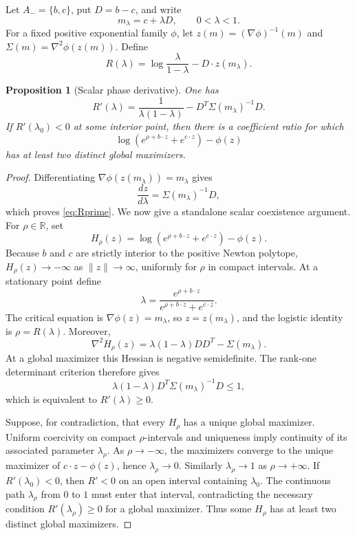 \documentclass[11pt]{article}
\theoremstyle{plain}
\newtheorem{proposition}[theorem]{Proposition}
\theoremstyle{definition}
\theoremstyle{remark}
\newcommand{\R}{\mathbb R}
\begin{document}
Let $A_-=\{b,c\}$, put $D=b-c$, and write
\[
 m_\lambda=c+\lambda D,
 \qquad 0<\lambda<1.
\]
For a fixed positive exponential family $\phi$, let $z(m)=(\nabla\phi)^{-1}(m)$ and $\Sigma(m)=\nabla^2\phi(z(m))$. Define
\begin{equation}\label{eq:R}
 R(\lambda)=
 \log\frac{\lambda}{1-\lambda}
 -D\cdot z(m_\lambda).
\end{equation}

\begin{proposition}[Scalar phase derivative]\label{prop:scalar}
One has
\begin{equation}\label{eq:Rprime}
 R'(\lambda)=
 \frac1{\lambda(1-\lambda)}
 -D^T\Sigma(m_\lambda)^{-1}D.
\end{equation}
If $R'(\lambda_0)<0$ at some interior point, then there is a coefficient ratio for which
\[
 \log\left(e^{\rho+b\cdot z}+e^{c\cdot z}\right)-\phi(z)
\]
has at least two distinct global maximizers.
\end{proposition}

\begin{proof}
Differentiating $\nabla\phi(z(m_\lambda))=m_\lambda$ gives
\[
 \frac{dz}{d\lambda}=\Sigma(m_\lambda)^{-1}D,
\]
which proves \eqref{eq:Rprime}. We now give a standalone scalar coexistence argument.
For $\rho\in\R$, set
\[
 H_\rho(z)=\log\!\left(e^{\rho+b\cdot z}+e^{c\cdot z}\right)-\phi(z).
\]
Because $b$ and $c$ are strictly interior to the positive Newton polytope, $H_\rho(z)\to-\infty$ as $\|z\|\to\infty$, uniformly for $\rho$ in compact intervals. At a stationary point define
\[
 \lambda=\frac{e^{\rho+b\cdot z}}{e^{\rho+b\cdot z}+e^{c\cdot z}}.
\]
The critical equation is $\nabla\phi(z)=m_\lambda$, so $z=z(m_\lambda)$, and the logistic identity is $\rho=R(\lambda)$. Moreover,
\[
 \nabla^2H_\rho(z)=\lambda(1-\lambda)DD^T-\Sigma(m_\lambda).
\]
At a global maximizer this Hessian is negative semidefinite. The rank-one determinant criterion therefore gives
\[
 \lambda(1-\lambda)D^T\Sigma(m_\lambda)^{-1}D\le1,
\]
which is equivalent to $R'(\lambda)\ge0$.

Suppose, for contradiction, that every $H_\rho$ has a unique global maximizer. Uniform coercivity on compact $\rho$-intervals and uniqueness imply continuity of its associated parameter $\lambda_\rho$. As $\rho\to-\infty$, the maximizers converge to the unique maximizer of $c\cdot z-\phi(z)$, hence $\lambda_\rho\to0$. Similarly $\lambda_\rho\to1$ as $\rho\to+\infty$. If $R'(\lambda_0)<0$, then $R'<0$ on an open interval containing $\lambda_0$. The continuous path $\lambda_\rho$ from $0$ to $1$ must enter that interval, contradicting the necessary condition $R'(\lambda_\rho)\ge0$ for a global maximizer. Thus some $H_\rho$ has at least two distinct global maximizers.
\end{proof}
\end{document}
